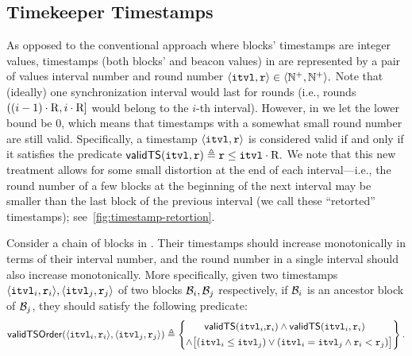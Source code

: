 \subsection{Timekeeper Timestamps}
\label{subsec:protocol-timestamps}

As opposed to the conventional approach where blocks' timestamps are integer values, timestamps (both blocks' and beacon values) in \timekeeper are represented by a pair of values interval number and round number
%
\( \langle \mathtt{itvl}, \mathtt{r} \rangle \in \langle \mathbb{N}^+, \mathbb{N}^+ \rangle. \)
%
Note that (ideally) one synchronization interval would last for \syncLen rounds (i.e., rounds $((i - 1) \cdot \mathrm{R}, i \cdot \mathrm{R}]$ would belong to the $i$-th interval).
%
However, in \timekeeper we let the lower bound be $0$, which means that timestamps with a somewhat small round number are still valid.
%
Specifically, a timestamp $\langle \mathtt{itvl}, \mathtt{r} \rangle$ is considered valid if and only if it satisfies the predicate
%
\( \mathsf{validTS}(\mathtt{itvl}, \mathtt{r}) \triangleq \mathtt{r} \le \mathtt{itvl} \cdot \mathrm{R}. \)
%
We note that this new treatment allows for some small distortion at the end of each interval---i.e., the round number of a few blocks at the beginning of the next interval may be smaller than the last block of the previous interval (we call these ``retorted'' timestamps); see~\cref{fig:timestamp-retortion}.



Consider a chain of blocks in \timekeeper.
%
Their timestamps should increase monotonically in terms of their interval number, and the round number in a single interval should also increase monotonically.
%
More specifically, given two timestamps $\langle \mathtt{itvl}_i, \mathtt{r}_i \rangle, \langle \mathtt{itvl}_j, \mathtt{r}_j \rangle$ of two blocks $\mathcal{B}_i, \mathcal{B}_j$ respectively, if $\mathcal{B}_i$ is an ancestor block of $\mathcal{B}_j$, they should satisfy the following predicate:
%
\begin{equation*}
    \mathsf{validTSOrder}(\langle \mathtt{itvl}_i, \mathtt{r}_i \rangle, \langle \mathtt{itvl}_j, \mathtt{r}_j \rangle) \triangleq
    \left\{
    \begin{aligned}
        \mathsf{validTS}(\mathtt{itvl}_i,              & \mathtt{r}_i) \wedge \mathsf{validTS}(\mathtt{itvl}_i, \mathtt{r}_i)          \\
        \wedge \big[ (\mathtt{itvl}_i \le \mathtt{itvl}_j) & \vee (\mathtt{itvl}_i = \mathtt{itvl}_j \wedge \mathtt{r}_i < \mathtt{r}_j) \big]
    \end{aligned}
    \right\}.
\end{equation*}


